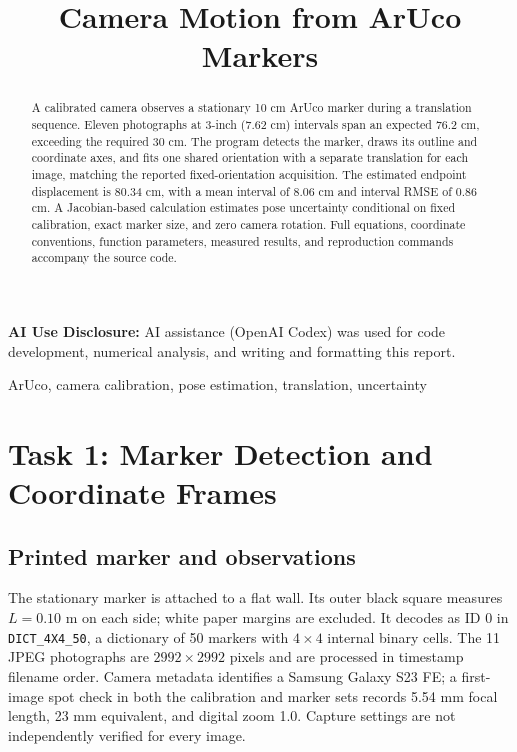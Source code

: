 \documentclass[conference,letterpaper]{IEEEtran}
\title{Camera Motion from ArUco Markers}
\author{\IEEEauthorblockN{Jordan Brown}\IEEEauthorblockA{ME 566\\Homework 4: Camera Motion}}
\newcommand{\code}[1]{\nolinkurl{#1}}
\begin{document}
\maketitle
\noindent\textbf{AI Use Disclosure:} AI assistance (OpenAI Codex) was used for code development, numerical analysis, and writing and formatting this report.
\par\medskip
\begin{abstract}
A calibrated camera observes a stationary 10 cm ArUco marker during a translation sequence. Eleven photographs at 3-inch (7.62 cm) intervals span an expected 76.2 cm, exceeding the required 30 cm. The program detects the marker, draws its outline and coordinate axes, and fits one shared orientation with a separate translation for each image, matching the reported fixed-orientation acquisition. The estimated endpoint displacement is 80.34 cm, with a mean interval of 8.06 cm and interval RMSE of 0.86 cm. A Jacobian-based calculation estimates pose uncertainty conditional on fixed calibration, exact marker size, and zero camera rotation. Full equations, coordinate conventions, function parameters, measured results, and reproduction commands accompany the source code.
\end{abstract}
\begin{IEEEkeywords}ArUco, camera calibration, pose estimation, translation, uncertainty\end{IEEEkeywords}

\section{Task 1: Marker Detection and Coordinate Frames}
\subsection{Printed marker and observations}
The stationary marker is attached to a flat wall. Its outer black square measures $L=0.10$ m on each side; white paper margins are excluded. It decodes as ID 0 in \code{DICT_4X4_50}, a dictionary of 50 markers with $4\times4$ internal binary cells. The 11 JPEG photographs are $2992\times2992$ pixels and are processed in timestamp filename order. Camera metadata identifies a Samsung Galaxy S23 FE; a first-image spot check in both the calibration and marker sets records 5.54 mm focal length, 23 mm equivalent, and digital zoom 1.0. Capture settings are not independently verified for every image.
\end{document}
